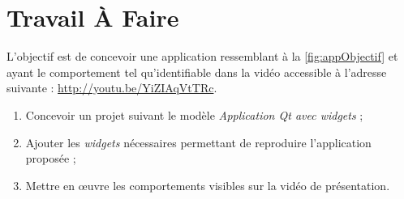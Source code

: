 \documentclass[12pt,a4paper,oneside,titlepage,final]{article}
\begin{document}


\section{Travail À Faire}
L'objectif est de concevoir une application ressemblant à la
\figurename \vref{fig:appObjectif} et ayant le comportement tel
qu'identifiable dans la vidéo accessible à l'adresse suivante :
\url{http://youtu.be/YiZIAqVtTRc}.
\begin{enumerate}
    \item Concevoir un projet suivant le modèle \emph{Application \gls{Qt} avec widgets} ;
    \item Ajouter les \emph{widgets} nécessaires permettant de reproduire l'application proposée ;
    \item Mettre en œuvre les comportements visibles sur la vidéo de présentation.
\end{enumerate}


\newpage \printbibheading
\printbibliography[nottype=online,check=notonline,heading=subbibliography,title={Bibliographiques}]
\printbibliography[check=online,heading=subbibliography,title={Webographiques}]

\printglossaries
\end{document}
